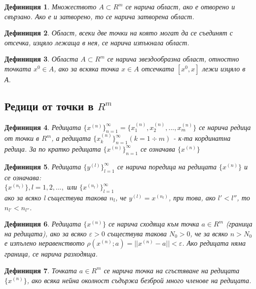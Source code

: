 \documentclass[fleqn]{article}
\newtheorem{definition}{Дефиниция}[subsection]
\begin{document}
\begin{definition}
Множеството  $A \subset R^m $ се нарича област, ако е отворено и свързано. Ако е и затворено, то се нарича затворена област. 
\end{definition}

\begin{definition}
Област, всеки две точки на която могат да се съединят с отсечка, изцяло лежаща в нея, се нарича изпъкнала област. 
\end{definition}

\begin{definition}
Областа $A \subset R^m $ се нарича звездообразна област, отностно точката $x^0 \in A$, ако за вскяка точка $x \in A$ отсечката $[x^0,x]$ лежи изцяло в А. 
\end{definition}

\subsection{Редици от точки в $R^m$}

\begin{definition}
Редицата $\{ x^{(n)} \}_{n = 1} ^ \infty = \{x_1 ^{(n)}, x_2 ^{(n)}, ... , x_m^{(n)}\} $ се нарича редица от точки в $R^m$, а редицата $\{ x_k ^{(n)}\}_{n=1} ^ \infty ( k = 1 \div m) $ - к-та кординатна редица. За по кратко редицата $\{ x^{(n)} \}_{n = 1} ^ \infty$ се означава $\{ x^{(n)} \}$
\end{definition}

\begin{definition}
Редицата $\{ y^{(l)} \}_{l = 1} ^ \infty$ се нарича поредица на редицата $\{ x^{(n)} \}$ и се означава:\\
$\{ x^{(n_l)} \}, l = 1, 2, ..., $ или $\{ x^{(n_l)} \}_{l = 1} ^ \infty$\\
ако за всяко l съществува такова $n_l$, че $y^{(l)} = x^{(n_l)}$, при това, ако $l' < l'' $, то $n_{l'}<n_{l''}$.
\end{definition}

\begin{definition}
Редицата $\{ x^{(n)} \}$ се нарича сходяща към точка $a \in R^m$ (граница на редицата), ако за всяко $\varepsilon > 0$ съществува такова $N_0 > 0$, че за всяко $n > N_0$ е изпълено неравенството $\rho(x^{(n)};a) = ||x^{(n)} - a|| < \varepsilon$. Ако редицата няма граница, се нарича разходяща. 
\end{definition}


\begin{definition}
Точката $a \in R^m$ се нарича точка на сгъстяване на редицата $\{ x^{(n)} \}$, ако всяка нейна околност съдържа безброй много членове на редицата. 
\end{definition}
\end{document}
